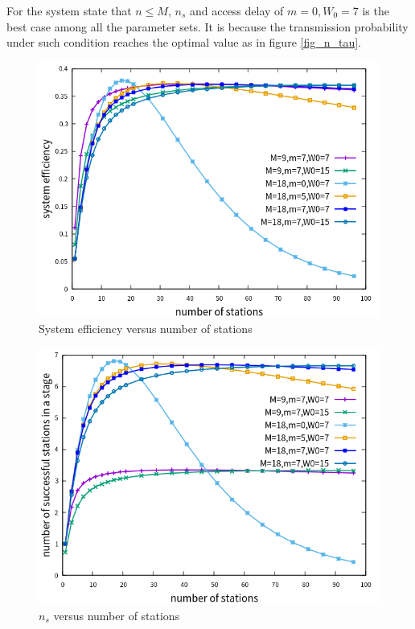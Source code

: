 For the system state that $n\leq M$, $n_s$ and access delay of $m=0,W_0 = 7$ is the best case among all the parameter sets. It is because the transmission probability under such condition reaches the optimal value as in figure \ref{fig_n_tau}.  

\begin{figure}[!ht]
\includegraphics[scale=.54]{./figure/n_rule_eff_perf.png}
\caption{System efficiency versus number of stations}
\label{fig_n_eff_val}
\end{figure}

\begin{figure}[!ht]
\includegraphics[scale=.54]{./figure/n_rule_ns_perf.png}
\caption{$n_s$ versus number of stations}
\label{fig_n_ns_val}
\end{figure}

